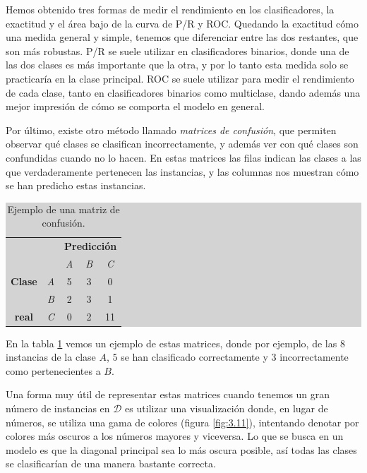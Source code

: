 Hemos obtenido tres formas de medir el rendimiento en los clasificadores, la exactitud y el área bajo de la curva de P/R y ROC. Quedando la exactitud cómo una medida general y simple, tenemos que diferenciar entre las dos restantes, que son más robustas. P/R se suele utilizar en clasificadores binarios, donde una de las dos clases es más importante que la otra, y por lo tanto esta medida solo se practicaría en la clase principal. ROC se suele utilizar para medir el rendimiento de cada clase, tanto en clasificadores binarios como multiclase, dando además una mejor impresión de cómo se comporta el modelo en general.

Por último, existe otro método llamado \emph{matrices de confusión}, que permiten observar qué clases se clasifican incorrectamente, y además ver con qué clases son confundidas cuando no lo hacen. En estas matrices las filas indican las clases a las que verdaderamente pertenecen las instancias, y las columnas nos muestran cómo se han predicho estas instancias.

\begin{table}[ht]
\centering
\colorbox{lightgray}{\begin{tabular}{*{5}{c}}
  & & \multicolumn{3}{c}{\textbf{Predicción}} \\
  & & \textit{A} & \textit{B} & \textit{C} \\
  \textbf{Clase} & \textit{A} & 5 & 3 & 0 \\
  & \textit{B} & 2 & 3 & 1 \\
  \textbf{real} & \textit{C} & 0 & 2 & 11
\end{tabular}}
\caption{Ejemplo de una matriz de confusión.}
\label{table:3.3}
\end{table}

En la tabla \ref{table:3.3} vemos un ejemplo de estas matrices, donde por ejemplo, de las $8$ instancias de la clase $A$, $5$ se han clasificado correctamente y $3$ incorrectamente como pertenecientes a $B$.

Una forma muy útil de representar estas matrices cuando tenemos un gran número de instancias en $\mathcal{D}$ es utilizar una visualización donde, en lugar de números, se utiliza una gama de colores (figura \ref{fig:3.11}), intentando denotar por colores más oscuros a los números mayores y viceversa. Lo que se busca en un modelo es que la diagonal principal sea lo más oscura posible, así todas las clases se clasificarían de una manera bastante correcta.

